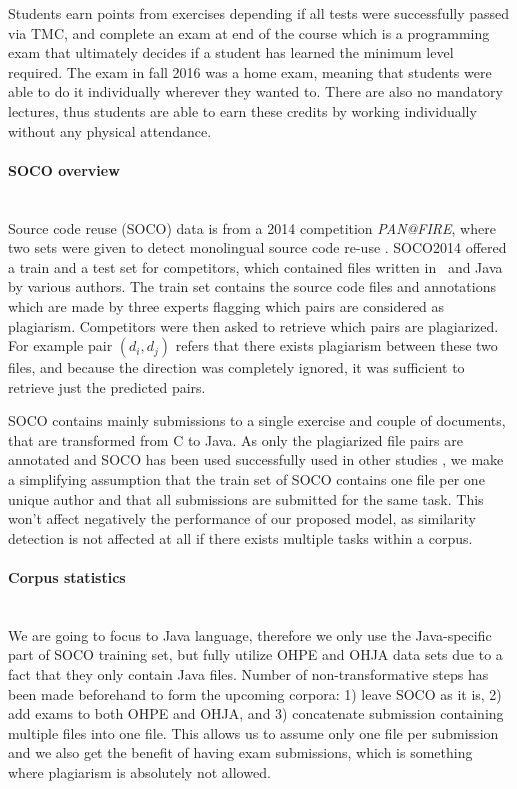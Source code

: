 Students earn points from exercises depending if all tests were successfully passed via TMC, and complete an exam at end of the course which is a programming exam that ultimately decides if a student has learned the minimum level required. The exam in fall 2016 was a home exam, meaning that students were able to do it individually wherever they wanted to. There are also no mandatory lectures, thus students are able to earn these credits by working individually without any physical attendance. 

\paragraph{SOCO overview}\mbox{}\\
Source code reuse (SOCO) data is from a 2014 competition \emph{PAN@FIRE}, where two sets were given to detect monolingual source code re-use \cite{saez2014pan}. SOCO2014 offered a train and a test set for competitors, which contained files written in \cpp\, and Java by various authors. The train set contains the source code files and annotations which are made by three experts flagging which pairs are considered as plagiarism. Competitors were then asked to retrieve which pairs are plagiarized. For example pair $(d_i, d_j)$ refers that there exists plagiarism between these two files, and because the direction was completely ignored, it was sufficient to retrieve just the predicted pairs.

SOCO contains mainly submissions to a single exercise and couple of documents, that are transformed from C to Java. As only the plagiarized file pairs are annotated and SOCO has been used successfully used in other studies \cite{AIR2015, RCISCP2017, OTIOLSS2015, USCR2014}, we make a simplifying assumption that the train set of SOCO contains one file per one unique author and that all submissions are submitted for the same task. This won't affect negatively the performance of our proposed model, as similarity detection is not affected at all if there exists multiple tasks within a corpus. 



\paragraph{Corpus statistics}\mbox{}\\
We are going to focus to Java language, therefore we only use the Java-specific part of SOCO training set, but fully utilize OHPE and OHJA data sets due to a fact that they only contain Java files. Number of non-transformative steps has been made beforehand to form the upcoming corpora: 1) leave SOCO as it is, 2) add exams to both OHPE and OHJA, and 3) concatenate submission containing multiple files into one file. This allows us to assume only one file per submission and we also get the benefit of having exam submissions, which is something where plagiarism is absolutely not allowed. 

